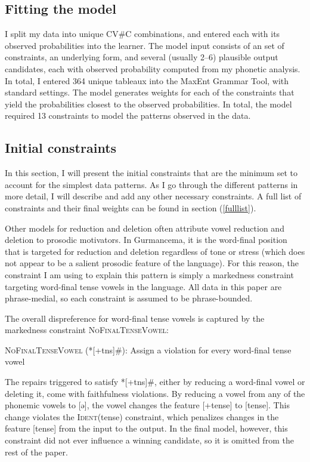 \documentclass[output=paper,newtxmath,modfonts,nonflat,draftmode]{langsci/langscibook}
\begin{document}
\subsection{Fitting the model}

I split my data into unique CV\#C combinations, and entered each with its observed probabilities into the learner. The model input consists of an set of constraints, an underlying form, and several (usually 2--6) plausible output candidates, each with observed probability computed from my phonetic analysis. In total, I entered 364 unique tableaux into the MaxEnt Grammar Tool, with standard settings. The model generates weights for each of the constraints that yield the probabilities closest to the observed probabilities. In total, the model required 13 constraints to model the patterns observed in the data. 

\subsection{Initial constraints}
In this section, I will present the initial constraints that are the minimum set to account for the simplest data patterns. As I go through the different patterns in more detail, I will describe and add any other necessary constraints. A full list of constraints and their final weights can be found in section (\ref{fulllist}). 

Other models for reduction and deletion often attribute vowel reduction and deletion to prosodic motivators. In Gurmancema, it is the word-final position that is targeted for reduction and deletion regardless of tone or stress (which does not appear to be a salient prosodic feature of the language). For this reason, the constraint I am using to explain this pattern is simply a markedness constraint targeting word-final tense vowels in the language. All data in this paper are phrase-medial, so each constraint is assumed to be phrase-bounded. 

The overall dispreference for word-final tense vowels is captured by the 
markedness constraint \textsc{NoFinalTenseVowel}:

\ea
\textsc{NoFinalTenseVowel} (*[+tns]\#): Assign a violation for every word-final 	tense vowel
\z

The repairs triggered to satisfy *[+tns]\#, either by reducing a word-final vowel or deleting it, come with faithfulness violations. By reducing a vowel from any of the phonemic vowels to [ə], the vowel changes the feature [+tense] to [\textminus tense]. This change violates the \textsc{Ident}(tense) constraint, which penalizes changes in the feature [tense] from the input to the output. In the final model, however, this constraint did not ever influence a winning candidate, so it is omitted from the rest of the paper.
\end{document}
